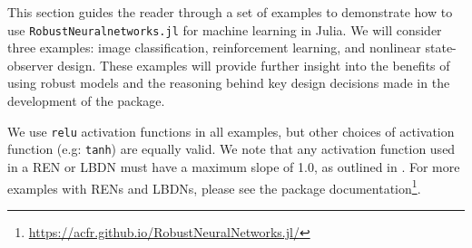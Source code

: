 This section guides the reader through a set of examples to demonstrate how to use \verb|RobustNeuralnetworks.jl| for machine learning in Julia. We will consider three examples: image classification, reinforcement learning, and nonlinear state-observer design. These examples will provide further insight into the benefits of using robust models and the reasoning behind key design decisions made in the development of the package.

We use \verb|relu| activation functions in all examples, but other choices of activation function (e.g: \verb|tanh|) are equally valid. We note that any activation function used in a REN or LBDN must have a maximum slope of 1.0, as outlined in \cite{Revay++2021b,Wang+Manchester2023}. For more examples with RENs and LBDNs, please see the package documentation\footnote{\url{https://acfr.github.io/RobustNeuralNetworks.jl/}}.